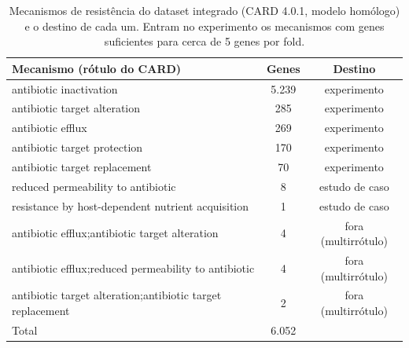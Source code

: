 \begin{table}[htbp]
  \centering
  \caption{Mecanismos de resistência do dataset integrado (CARD 4.0.1, modelo homólogo) e o destino de cada um. Entram no experimento os mecanismos com genes suficientes para cerca de 5 genes por fold.}
  \label{tab:composicao}
  \begin{tabular}{lcc}
    \toprule
    Mecanismo (rótulo do CARD) & Genes & Destino \\
    \midrule
    antibiotic inactivation & 5.239 & experimento \\
    antibiotic target alteration & 285 & experimento \\
    antibiotic efflux & 269 & experimento \\
    antibiotic target protection & 170 & experimento \\
    antibiotic target replacement & 70 & experimento \\
    reduced permeability to antibiotic & 8 & estudo de caso \\
    resistance by host-dependent nutrient acquisition & 1 & estudo de caso \\
    antibiotic efflux;antibiotic target alteration & 4 & fora (multirrótulo) \\
    antibiotic efflux;reduced permeability to antibiotic & 4 & fora (multirrótulo) \\
    antibiotic target alteration;antibiotic target replacement & 2 & fora (multirrótulo) \\
    Total & 6.052 &  \\
    \bottomrule
  \end{tabular}
\end{table}
